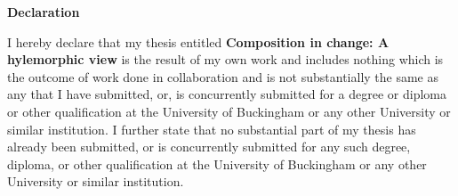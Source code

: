 \clearpage
\begin{center}
{\Large \bf Declaration}
\end{center}

\noindent I hereby declare that my thesis entitled {\bf Composition in change: A hylemorphic view} is the result of my own work and includes nothing which is the outcome of work done in collaboration and is not substantially the same as any that I have submitted, or, is concurrently submitted for a degree or diploma or other qualification at the University of Buckingham or any other University or similar institution. I further state that no substantial part of my thesis has already been submitted, or is concurrently submitted for any such degree, diploma, or other qualification at the University of Buckingham or any other University or similar institution.
